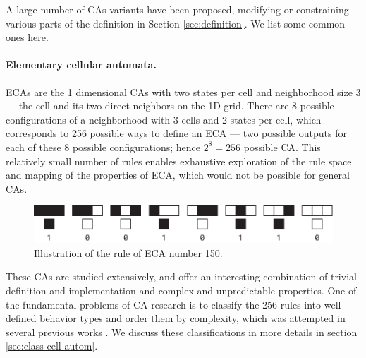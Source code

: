 A large number of \acp{CA} variants have been proposed, modifying or
constraining various parts of the definition in Section \ref{sec:definition}.
We list some common ones here.

\paragraph{Elementary cellular automata.\label{sec:elem-cell-autom}}
\Acp{ECA} are the 1 dimensional \acp{CA} with two states per cell and
neighborhood size 3 --- the cell and its two direct neighbors on the 1D grid.
There are 8 possible configurations of a neighborhood with 3 cells and 2 states
per cell, which corresponds to 256 possible ways to define an \ac{ECA} --- two
possible outputs for each of these 8 possible configurations; hence
$2^{8} = 256$ possible \ac{CA}. This relatively small number of rules enables
exhaustive exploration of the rule space and mapping of the properties of \ac{ECA},
which would not be possible for general \acp{CA}.

\begin{figure}[htbp]
  \centering
  \includegraphics[width=.95\linewidth]{figures/eca_150_rule}
  \caption{Illustration of the rule of \ac{ECA} number 150.}
  \label{fig:eca_150_rule}
\end{figure}

These \acp{CA} are studied extensively, and offer an interesting combination of
trivial definition and implementation and complex and unpredictable properties.
One of the fundamental problems of \ac{CA} research is to classify the 256 rules
into well-defined behavior types and order them by complexity, which was
attempted in several previous works
\parencite{wuenscheGlobalDynamicsCellular1992,
  gutowitzTransientsCyclesComplexity1991,
  wuenscheClassifyingCellularAutomata1999, wolframNewKindScience2002,
  zenilCompressionBasedInvestigationDynamical2010,
  hudcovaClassificationComplexSystems2020,
  hudcovaComputationalHierarchyElementary2021}. We discuss these classifications
in more details in section \ref{sec:class-cell-autom}.

